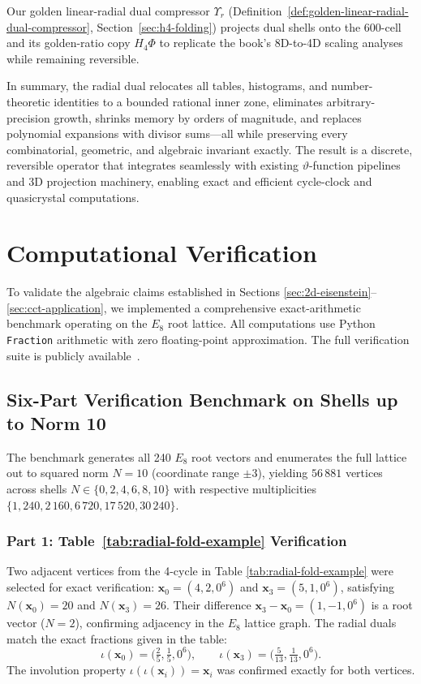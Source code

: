 \documentclass{article}
\begin{document}
Our golden linear-radial dual compressor \(\Upsilon_r\) (Definition~\ref{def:golden-linear-radial-dual-compressor}, Section~\ref{sec:h4-folding}) projects dual shells onto the 600-cell and its golden-ratio copy \(H_4\Phi\) to replicate the book's 8D-to-4D scaling analyses while remaining reversible.

In summary, the radial dual relocates all tables, histograms, and number-theoretic identities to a bounded rational inner zone, eliminates arbitrary-precision growth, shrinks memory by orders of magnitude, and replaces polynomial expansions with divisor sums---all while preserving every combinatorial, geometric, and algebraic invariant exactly. The result is a discrete, reversible operator that integrates seamlessly with existing $\vartheta$-function pipelines and 3D projection machinery, enabling exact and efficient cycle-clock and quasicrystal computations.

\section{Computational Verification}
\label{sec:computational-verification}

To validate the algebraic claims established in Sections \ref{sec:2d-eisenstein}--\ref{sec:cct-application}, we implemented a comprehensive exact-arithmetic benchmark operating on the $E_8$ root lattice. All computations use Python \texttt{Fraction} arithmetic with zero floating-point approximation. The full verification suite is publicly available~\cite{RadialDualCode}.

\subsection{Six-Part Verification Benchmark on Shells up to Norm 10}
\label{subsec:six-part-benchmark}

The benchmark generates all 240 $E_8$ root vectors and enumerates the full lattice out to squared norm $N = 10$ (coordinate range $\pm 3$), yielding $56\,881$ vertices across shells $N \in \{0, 2, 4, 6, 8, 10\}$ with respective multiplicities $\{1, 240, 2\,160, 6\,720, 17\,520, 30\,240\}$.

\subsubsection{Part 1: Table~\ref{tab:radial-fold-example} Verification}
Two adjacent vertices from the 4-cycle in Table \ref{tab:radial-fold-example} were selected for exact verification: $\mathbf{x}_0 = (4,2,0^6)$ and $\mathbf{x}_3 = (5,1,0^6)$, satisfying $N(\mathbf{x}_0) = 20$ and $N(\mathbf{x}_3) = 26$. Their difference $\mathbf{x}_3 - \mathbf{x}_0 = (1,-1,0^6)$ is a root vector ($N = 2$), confirming adjacency in the $E_8$ lattice graph. The radial duals match the exact fractions given in the table:
\[
\iota(\mathbf{x}_0) = \bigl(\tfrac{2}{5}, \tfrac{1}{5}, 0^6 \bigr), \qquad
\iota(\mathbf{x}_3) = \bigl(\tfrac{5}{13}, \tfrac{1}{13}, 0^6 \bigr).
\]
The involution property $\iota(\iota(\mathbf{x}_i)) = \mathbf{x}_i$ was confirmed exactly for both vertices.
\end{document}
